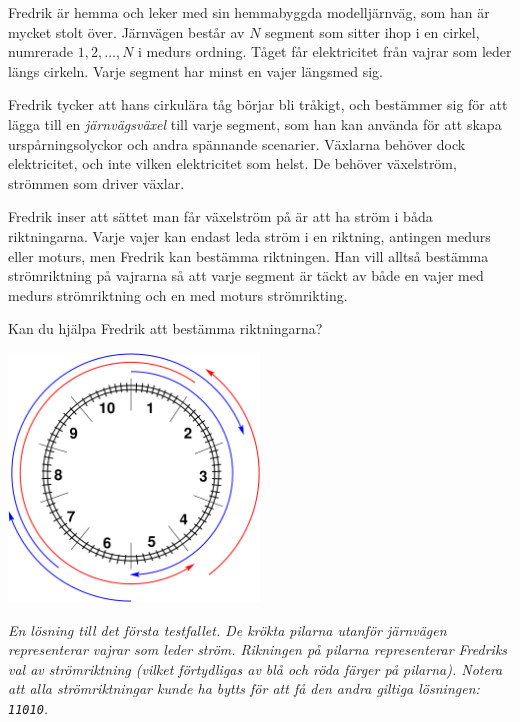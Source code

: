\ifx\boi\undefined\fi
\def\version{jury-1}
Fredrik är hemma och leker med sin hemmabyggda modelljärnväg, som han är mycket stolt över.
Järnvägen består av $N$ segment som sitter ihop i en cirkel, numrerade $1, 2, \dots, N$ i medurs ordning.
Tåget får elektricitet från vajrar som leder längs cirkeln. Varje segment har minst en vajer längsmed sig. 

Fredrik tycker att hans cirkulära tåg börjar bli tråkigt, och bestämmer sig för att lägga till en \emph{järnvägsväxel} till varje segment, som han kan använda för att skapa urspårningsolyckor och andra spännande scenarier.
Växlarna behöver dock elektricitet, och inte vilken elektricitet som helst. 
De behöver växelström, strömmen som driver växlar.

Fredrik inser att sättet man får växelström på är att ha ström i båda riktningarna.
Varje vajer kan endast leda ström i en riktning, antingen medurs eller moturs, 
men Fredrik kan bestämma riktningen. Han vill alltså bestämma strömriktning på vajrarna
så att varje segment är täckt av både en vajer med medurs strömriktning och en med moturs
strömrikting.

Kan du hjälpa Fredrik att bestämma riktningarna?

\vspace{2mm}
\begin{center}
\includegraphics[width=0.5\textwidth]{alternatingfig.pdf}
\end{center}
\vspace{1mm}
{\em En lösning till det första testfallet. De krökta pilarna utanför järnvägen representerar 
vajrar som leder ström. Rikningen på pilarna representerar Fredriks val av strömriktning (vilket förtydligas av blå och röda färger på pilarna). Notera att alla strömriktningar kunde ha bytts för att få den andra giltiga lösningen: \texttt{11010}.}

